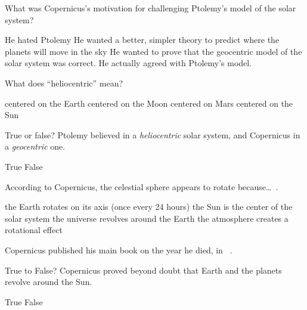 \documentclass[addpoints]{exam}
\begin{document}
\begin{questions}
\question
What was Copernicus's motivation for challenging Ptolemy's model of the solar system?

\begin{choices}
    \choice He hated Ptolemy
    \correctchoice He wanted a better, simpler theory to predict where the planets will move in the sky
    \choice He wanted to prove that the geocentric model of the solar system was correct.
    \choice He actually agreed with Ptolemy's model.
\end{choices}

\question
What does ``heliocentric'' mean?

\begin{choices}
    \choice centered on the Earth
    \choice centered on the Moon
    \choice centered on Mars
    \correctchoice centered on the Sun
\end{choices}

\question
True or false? Ptolemy believed in a \textit{heliocentric} solar system, and Copernicus in a \textit{geocentric} one.

\begin{choices}
    \choice True
    \correctchoice False
\end{choices}

\question
According to Copernicus, the celestial sphere appears to rotate because\ldots\ .

\begin{choices}
    \correctchoice the Earth rotates on its axis (once every 24 hours)
    \choice the Sun is the center of the solar system
    \choice the universe revolves around the Earth
    \choice the atmosphere creates a rotational effect
    
\end{choices}

\question
Copernicus published his main book on the year he died, in \fillin\ .

\begin{choices}
\end{choices}

\clearpage

\question
True to False? Copernicus proved beyond doubt that Earth and the planets revolve around the Sun.

\begin{choices}
    \choice True
    \correctchoice False
\end{choices}


\end{questions}
\end{document}
